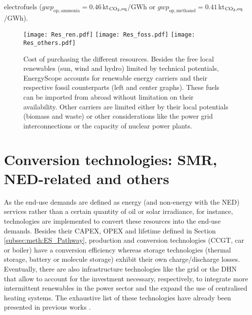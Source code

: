 electrofuels (\eg $\mathit{gwp}_{\mathrm{op,ammonia}}=0.46$\,kt$_{\ce{CO2},\text{eq}}$/GWh or $\mathit{gwp}_{\mathrm{op,methanol}}=0.41$\,kt$_{\ce{CO2},\text{eq}}$/GWh).

\begin{figure}[htbp!]
\centering

\texttt{[image: Res\_ren.pdf]}
\texttt{[image: Res\_foss.pdf]}
\texttt{[image: Res\_others.pdf]}
\caption{Cost of purchasing the different resources. Besides the free local renewables (\ie sun, wind and hydro) limited by technical potentials, EnergyScope accounts for renewable energy carriers and their respective fossil counterparts (left and center graphs). These fuels can be imported from abroad without limitation on their availability. Other carriers are limited either by their local potentials (\ie biomass and waste) or other considerations like the power grid interconnections or the capacity of nuclear power plants.}
\label{fig:cs_resources_cost}
\end{figure}


\section{Conversion technologies: SMR, \gls{NED}-related and others}
\label{sec:cs:technologies}
As the end-use demands are defined as energy (and non-energy with the \gls{NED}) services rather than a certain quantity of oil or solar irradiance, for instance, technologies are implemented to convert these resources into the end-use demands. Besides their CAPEX, OPEX and lifetime defined in Section \ref{subsec:meth:ES_Pathway}, production and conversion technologies (\ie \gls{CCGT}, car or boiler) have a conversion efficiency whereas storage technologies (\ie thermal storage, battery or molecule storage) exhibit their own charge/discharge losses. Eventually, there are also infrastructure technologies like the grid or the \gls{DHN} that allow to account for the investment necessary, respectively, to integrate more intermittent renewables in the power sector and the expand the use of centralised heating systems. The exhaustive list of these technologies have already been presented in previous works \cite{limpens2021generating}.\\

